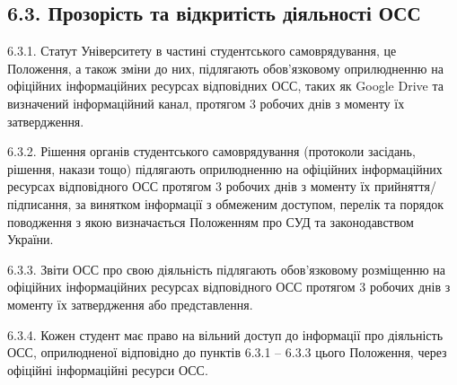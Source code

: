 \subsection*{6.3. Прозорість та відкритість діяльності ОСС} 
    6.3.1. Статут Університету в частині студентського самоврядування, це Положення, а також зміни до них, підлягають обов'язковому оприлюдненню на офіційних інформаційних ресурсах відповідних ОСС, таких як Google Drive та визначений інформаційний канал, протягом 3 робочих днів з моменту їх затвердження.

    6.3.2. Рішення органів студентського самоврядування (протоколи засідань, рішення, накази тощо) підлягають оприлюдненню на офіційних інформаційних ресурсах відповідного ОСС протягом 3 робочих днів з моменту їх прийняття/підписання, за винятком інформації з обмеженим доступом, перелік та порядок поводження з якою визначається Положенням про СУД та законодавством України.

    6.3.3. Звіти ОСС про свою діяльність підлягають обов'язковому розміщенню на офіційних інформаційних ресурсах відповідного ОСС протягом 3 робочих днів з моменту їх затвердження або представлення.

    6.3.4. Кожен студент має право на вільний доступ до інформації про діяльність ОСС, оприлюдненої відповідно до пунктів 6.3.1 – 6.3.3 цього Положення, через офіційні інформаційні ресурси ОСС.